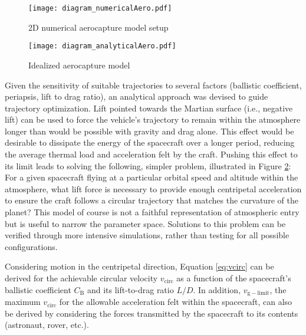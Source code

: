 \documentclass[final,3p,times,twocolumn,sort&compress, lefttitle]{elsarticle}
\begin{document}
                \begin{figure}[b]
                    \centering
                    \texttt{[image: diagram\_numericalAero.pdf]}
                    \caption{2D numerical aerocapture model setup}
                    \label{fig:aerocaptureNumModel}
                \end{figure}
                
                \begin{figure}[b]
                    \centering
                    \texttt{[image: diagram\_analyticalAero.pdf]}
                    \caption{Idealized aerocapture model}
                    \label{fig:aerocaptureModel}
                \end{figure}
                
                Given the sensitivity of suitable trajectories to several factors (ballistic coefficient, periapsis, lift to drag ratio), an analytical approach was devised to guide trajectory optimization. Lift pointed towards the Martian surface (i.e., negative lift) can be used to force the vehicle's trajectory to remain within the atmosphere longer than would be possible with gravity and drag alone. This effect would be desirable to dissipate the energy of the spacecraft over a longer period, reducing the average thermal load and acceleration felt by the craft. Pushing this effect to its limit leads to solving the following, simpler problem, illustrated in Figure \ref{fig:aerocaptureModel}: For a given spacecraft flying at a particular orbital speed and altitude within the atmosphere, what lift force is necessary to provide enough centripetal acceleration to ensure the craft follows a circular trajectory that matches the curvature of the planet? This model of course is not a faithful representation of atmospheric entry but is useful to narrow the parameter space. Solutions to this problem can be verified through more intensive simulations, rather than testing for all possible configurations.
                
                Considering motion in the centripetal direction, Equation \ref{eq:vcirc} can be derived for the achievable circular velocity $v_\mathrm{circ}$ as a function of the spacecraft's ballistic coefficient $C_\mathrm{B}$ and its lift-to-drag ratio $L/D$. In addition, $v_\mathrm{g-limit}$, the maximum $v_\mathrm{circ}$ for the allowable acceleration felt within the spacecraft, can also be derived by considering the forces transmitted by the spacecraft to its contents (astronaut, rover, etc.).
                
\end{document}
